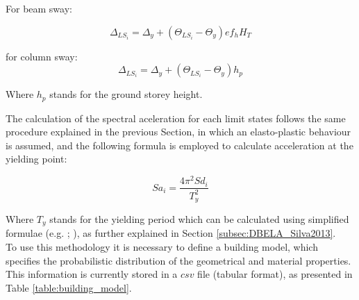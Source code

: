 For beam sway:

\begin{equation}
	\Delta_{LS_i} = \Delta_y + (\Theta_{LS_i} - \Theta_y)ef_hH_T
\end{equation}

for column sway:
\begin{equation}
	\Delta_{LS_i} = \Delta_y + (\Theta_{LS_i} - \Theta_y)h_p
\end{equation}

Where $h_p$ stands for the ground storey height.

The calculation of the spectral aceleration for each limit states follows the same procedure explained in the previous Section, in which an elasto-plastic behaviour is assumed, and the following formula is employed to calculate acceleration at the yielding point:

\begin{equation}
	Sa_i = \frac{4\pi^2Sd_i}{T_y^2}
\end{equation}

Where $T_y$ stands for the yielding period which can be calculated using simplified formulae (e.g. \cite{CrowleyPinho2004}; \cite{CrowleyPinho2006}), as further explained in Section \ref{subsec:DBELA_Silva2013}.\\

To use this methodology it is necessary to define a building model, which specifies the probabilistic distribution of the geometrical and material properties. This information is currently stored in a $csv$ file (tabular format), as presented in Table \ref{table:building_model}.

